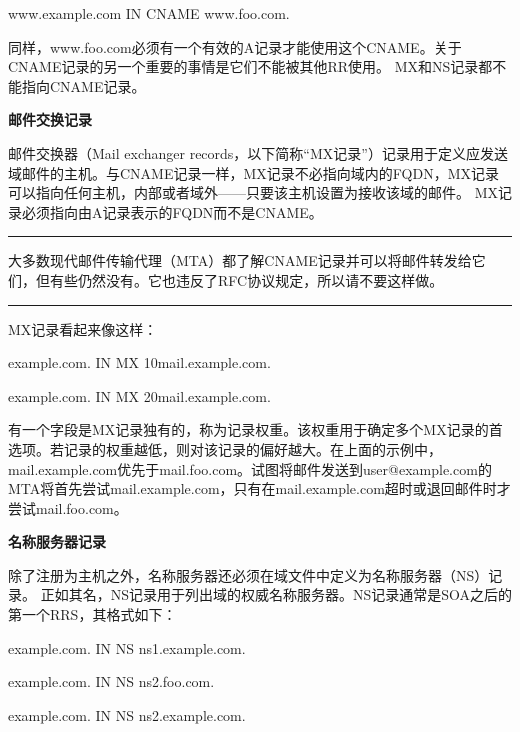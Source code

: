 ﻿\documentclass[english,runningheads,a4paper]{llncs}[2018/03/10]
\begin{document}
\par\setlength\parindent{2em}www.example.com  \qquad IN \qquad CNAME \qquad www.foo.com.

\par\setlength\parindent{2em}同样，www.foo.com必须有一个有效的A记录才能使用这个CNAME。关于CNAME记录的另一个重要的事情是它们不能被其他RR使用。 MX和NS记录都不能指向CNAME记录。

\vbox{}

\par\noindent\textbf{邮件交换记录}

\par\noindent 邮件交换器（Mail exchanger records，以下简称“MX记录”）记录用于定义应发送域邮件的主机。与CNAME记录一样，MX记录不必指向域内的FQDN，MX记录可以指向任何主机，内部或者域外——只要该主机设置为接收该域的邮件。 MX记录必须指向由A记录表示的FQDN而不是CNAME。

\par\noindent\rule[0.25\baselineskip]{\textwidth}{1pt} %

\begin{adjustwidth}{2em}{2em}
\qquad 大多数现代邮件传输代理（MTA）都了解CNAME记录并可以将邮件转发给它们，但有些仍然没有。它也违反了RFC协议规定，所以请不要这样做。
\end{adjustwidth}

\par\noindent\rule[0.25\baselineskip]{\textwidth}{1pt} %

\par\setlength\parindent{2em}MX记录看起来像这样：

\par\setlength\parindent{2em}example.com.  \qquad IN \qquad MX \qquad 10mail.example.com.

\par\setlength\parindent{2em}example.com.  \qquad IN \qquad MX \qquad 20mail.example.com.

\par\setlength\parindent{2em}有一个字段是MX记录独有的，称为记录权重。该权重用于确定多个MX记录的首选项。若记录的权重越低，则对该记录的偏好越大。在上面的示例中，mail.example.com优先于mail.foo.com。试图将邮件发送到user@example.com的MTA将首先尝试mail.example.com，只有在mail.example.com超时或退回邮件时才尝试mail.foo.com。

\vbox{}

\par\noindent\textbf{名称服务器记录}

\par\noindent 除了注册为主机之外，名称服务器还必须在域文件中定义为名称服务器（NS）记录。
正如其名，NS记录用于列出域的权威名称服务器。NS记录通常是SOA之后的第一个RRS，其格式如下：
\par\setlength\parindent{2em}example.com. \qquad IN \qquad NS \qquad ns1.example.com.

\par\setlength\parindent{2em}example.com. \qquad IN \qquad NS \qquad ns2.foo.com.

\par\setlength\parindent{2em}example.com. \qquad IN \qquad NS \qquad ns2.example.com.
\end{document}
